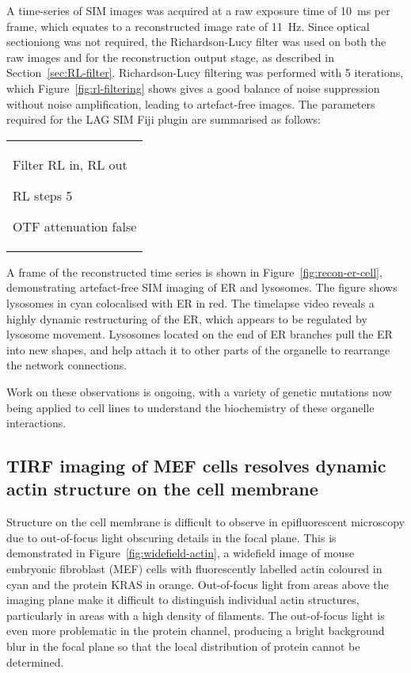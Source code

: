 A time-series of SIM images was acquired at a raw exposure time of \SI{10}{\milli\second} per frame, which equates to a reconstructed image rate of \SI{11}{\hertz}. 
Since optical sectioniong was not required, the Richardson-Lucy filter was used on both the raw images and for the reconstruction output stage, as described in Section~\ref{sec:RL-filter}. 
Richardson-Lucy filtering was performed with 5 iterations, which Figure~\ref{fig:rl-filtering} shows gives a good balance of noise suppression without noise amplification, leading to artefact-free images. 
The parameters required for the LAG SIM Fiji plugin are summarised as follows:
\newline
\begin{tabular}{p{}}
\begin{labelling}[margin=OTF attenuation]
	\item[Filter] RL in, RL out
	\item[RL steps] 5
	\item[OTF attenuation] false
\end{labelling}
\end{tabular}

A frame of the reconstructed time series is shown in Figure~\ref{fig:recon-er-cell}, demonstrating artefact-free SIM imaging of ER and lysosomes. 
The figure shows lysosomes in cyan colocalised with ER in red. 
The timelapse video reveals a highly dynamic restructuring of the ER, which appears to be regulated by lysosome movement. 
Lysosomes located on the end of ER branches pull the ER into new shapes, and help attach it to other parts of the organelle to rearrange the network connections. 

Work on these observations is ongoing, with a variety of genetic mutations now being applied to cell lines to understand the biochemistry of these organelle interactions. 

\subsection{TIRF imaging of MEF cells resolves dynamic actin structure on the cell membrane}
Structure on the cell membrane is difficult to observe in epifluorescent microscopy due to out-of-focus light obscuring details in the focal plane. 
This is demonstrated in Figure~\ref{fig:widefield-actin}, a widefield image of mouse embryonic fibroblast (MEF) cells with fluorescently labelled actin coloured in cyan and the protein KRAS in orange. 
Out-of-focus light from areas above the imaging plane make it difficult to distinguish individual actin structures, particularly in areas with a high density of filaments.
The out-of-focus light is even more problematic in the protein channel, producing a bright background blur in the focal plane so that the local distribution of protein cannot be determined. 

